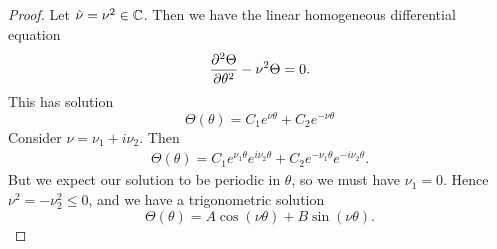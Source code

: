 \begin{proof}
  Let $\hat{\nu} = \nu^2 \in \mathbb{C}$. Then we have the linear homogeneous differential equation
  \begin{equation*}
    \frac{\partial ^2\Theta}{\partial \theta^2} - \nu^2 \Theta = 0.
  \end{equation*}
  This has solution
  \begin{equation*}
    \Theta(\theta) = C_1 e^{\nu\theta} + C_2 e^{-\nu\theta}
  \end{equation*}
  Consider $\nu = \nu_1 + i\nu_2$. Then
  \begin{align*}
    \Theta(\theta) = C_1 e^{\nu_1\theta}e^{i\nu_2\theta} + C_2 e^{-\nu_1\theta}e^{-i\nu_2\theta}.
  \end{align*}
  But we expect our solution to be periodic in $\theta$, so we must have $\nu_1 = 0$. Hence $\nu^2 = -\nu_2^2 \leq 0$, and we have a trigonometric solution
  \begin{equation}
    \Theta(\theta) = A \cos(\nu\theta) + B \sin(\nu\theta).
  \end{equation}\par


\end{proof}
